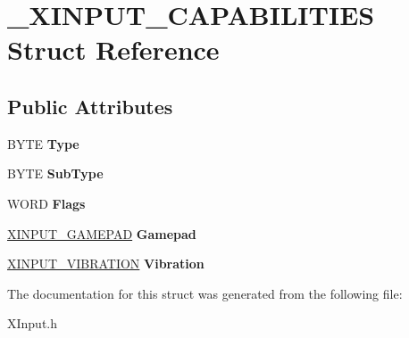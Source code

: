 \hypertarget{struct___x_i_n_p_u_t___c_a_p_a_b_i_l_i_t_i_e_s}{}\section{\+\_\+\+X\+I\+N\+P\+U\+T\+\_\+\+C\+A\+P\+A\+B\+I\+L\+I\+T\+I\+E\+S Struct Reference}
\label{struct___x_i_n_p_u_t___c_a_p_a_b_i_l_i_t_i_e_s}
\subsection*{Public Attributes}
\begin{DoxyCompactItemize}
\item 
\hypertarget{struct___x_i_n_p_u_t___c_a_p_a_b_i_l_i_t_i_e_s_aebd4bc7d89a584060bae91095e701710}{}B\+Y\+T\+E {\bfseries Type}\label{struct___x_i_n_p_u_t___c_a_p_a_b_i_l_i_t_i_e_s_aebd4bc7d89a584060bae91095e701710}

\item 
\hypertarget{struct___x_i_n_p_u_t___c_a_p_a_b_i_l_i_t_i_e_s_ab686f41df1cb509eebda27f84c76faa1}{}B\+Y\+T\+E {\bfseries Sub\+Type}\label{struct___x_i_n_p_u_t___c_a_p_a_b_i_l_i_t_i_e_s_ab686f41df1cb509eebda27f84c76faa1}

\item 
\hypertarget{struct___x_i_n_p_u_t___c_a_p_a_b_i_l_i_t_i_e_s_af3e5697dec6976b9fe19832528461b54}{}W\+O\+R\+D {\bfseries Flags}\label{struct___x_i_n_p_u_t___c_a_p_a_b_i_l_i_t_i_e_s_af3e5697dec6976b9fe19832528461b54}

\item 
\hypertarget{struct___x_i_n_p_u_t___c_a_p_a_b_i_l_i_t_i_e_s_a616f63856159601b68de30f107c810f5}{}\hyperlink{struct___x_i_n_p_u_t___g_a_m_e_p_a_d}{X\+I\+N\+P\+U\+T\+\_\+\+G\+A\+M\+E\+P\+A\+D} {\bfseries Gamepad}\label{struct___x_i_n_p_u_t___c_a_p_a_b_i_l_i_t_i_e_s_a616f63856159601b68de30f107c810f5}

\item 
\hypertarget{struct___x_i_n_p_u_t___c_a_p_a_b_i_l_i_t_i_e_s_a0202876df8a4467d284266e725b8256d}{}\hyperlink{struct___x_i_n_p_u_t___v_i_b_r_a_t_i_o_n}{X\+I\+N\+P\+U\+T\+\_\+\+V\+I\+B\+R\+A\+T\+I\+O\+N} {\bfseries Vibration}\label{struct___x_i_n_p_u_t___c_a_p_a_b_i_l_i_t_i_e_s_a0202876df8a4467d284266e725b8256d}

\end{DoxyCompactItemize}


The documentation for this struct was generated from the following file\+:\begin{DoxyCompactItemize}
\item 
X\+Input.\+h\end{DoxyCompactItemize}
